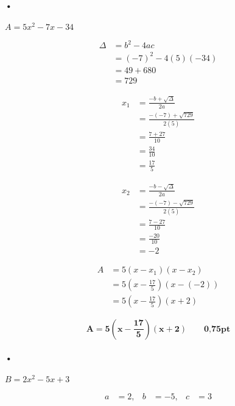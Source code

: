 \documentclass[12pt,a4paper]{article}
\begin{document}
\begin{enumerate}
\paragraph{•}  
\(
A = 5x^2 - 7x - 34
\)

\[
\begin{aligned}
\Delta &= b^2 - 4ac \\
       &= (-7)^2 - 4(5)(-34) \\
       &= 49 + 680 \\
       &= 729
\end{aligned}
\]

\[
\begin{aligned}
x_1 &= \frac{-b + \sqrt{\Delta}}{2a} \\
    &= \frac{-(-7) + \sqrt{729}}{2(5)} \\
    &= \frac{7 + 27}{10} \\
    &= \frac{34}{10} \\
    &= \frac{17}{5}
\end{aligned}
\]

\[
\begin{aligned}
x_2 &= \frac{-b - \sqrt{\Delta}}{2a} \\
    &= \frac{-(-7) - \sqrt{729}}{2(5)} \\
    &= \frac{7 - 27}{10} \\
    &= \frac{-20}{10} \\
    &= -2
\end{aligned}
\]

\[
\begin{aligned}
A &= 5(x - x_1)(x - x_2) \\
  &= 5 \left( x - \frac{17}{5} \right) \left( x - (-2) \right) \\
  &= 5 \left( x - \frac{17}{5} \right) \left( x + 2 \right) 
\end{aligned}
\]

\begin{tcolorbox}[colback=yellow!20, colframe=black, sharp corners]
    \[
    \mathbf{A = 5 \left( x - \frac{17}{5} \right) \left( x + 2 \right)}\quad\quad \textbf{0,75pt}
    \]
\end{tcolorbox}

\paragraph{•}
\(
B = 2x^2 - 5x + 3
\)

\[
\begin{aligned}
a &= 2, & b &= -5, & c &= 3
\end{aligned}
\]


\end{enumerate}
\end{document}
